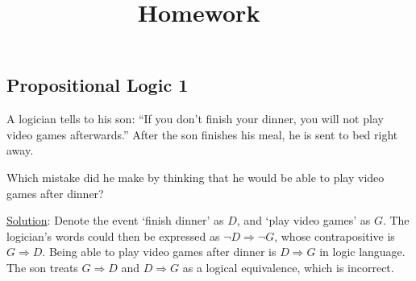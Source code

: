 \documentclass[11pt, answers]{exam}
\title{Homework \hmwkNumber\ \hmwkType}
\date{\hmwkDue}
\begin{document}
\maketitle

%
%
\begin{questions}
\section{Propositional Logic 1}
\question

A logician tells to his son: ``If you don't finish your dinner, you will not play video games afterwards.''
After the son finishes his meal, he is sent to bed right away.

Which mistake did he make by thinking that he would be able to play video games after dinner?

\underline{Solution}: Denote the event `finish dinner' as $D$, and `play video games' as $G$. The logician's words could then be expressed as $\neg D \Rightarrow \neg G$, whose contrapositive is $G \Rightarrow D$. Being able to play video games after dinner is $D \Rightarrow G$ in logic language. The son treats $G \Rightarrow D$ and $D \Rightarrow G$ as a logical equivalence, which is incorrect. 

\end{questions}
\end{document}
